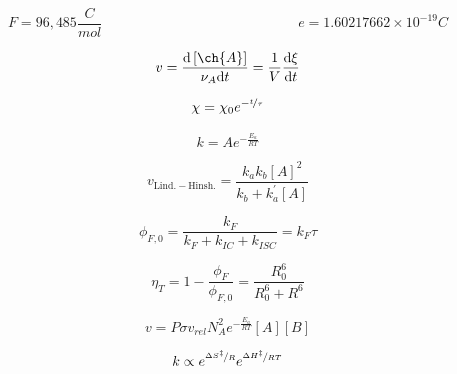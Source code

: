 \documentclass[12pt, letterpaper]{memoir}
\begin{document}
\begin{equation*}
	F=96,485\frac{C}{mol} \hspace{14em} e=1.60217662\times10^{-19} C
\end{equation*}

\begin{minipage}[t]{0.5\linewidth}
	\begin{equation*}
		v = \frac{\mathrm{d}\left[\ch{A}\right]}{\nu_A\mathrm{d}t}=\dfrac{1}{V}\dfrac{\mathrm{d}\xi}{\mathrm{d}t}
	\end{equation*}
	
	\begin{equation*}
		\chi = \chi_0e^{-\nicefrac{t}{\tau}}
	\end{equation*}
	
	\begin{equation*}
		k = Ae^{-\frac{E_a}{RT}}
	\end{equation*}
	
	\begin{equation*}
		v_{\mathrm{Lind.-Hinsh.}} = \dfrac{k_ak_b[A]^2}{k_b+k^\prime_a[A]}
	\end{equation*}
	
	\begin{equation*}
		\phi_{F,0}=\dfrac{k_F}{k_F+k_{IC}+k_{ISC}}= k_F\tau
	\end{equation*}
	
	\begin{equation*}
		\eta_T = 1 - \dfrac{\phi_F}{\phi_{F,0}} = \dfrac{R_0^6}{R_0^6 + R^6}
	\end{equation*}
	
	\begin{equation*}
		v= P\sigma v_{rel}N_A^2e^{-\frac{E_a}{RT}}[A][B]
	\end{equation*}
	
	\begin{equation*}
		k\propto e^{\nicefrac{\Delta S^{\ddagger}}{R}}e^{\nicefrac{\Delta H^{\ddagger}}{RT}}
	\end{equation*}
\end{minipage}
\end{document}
